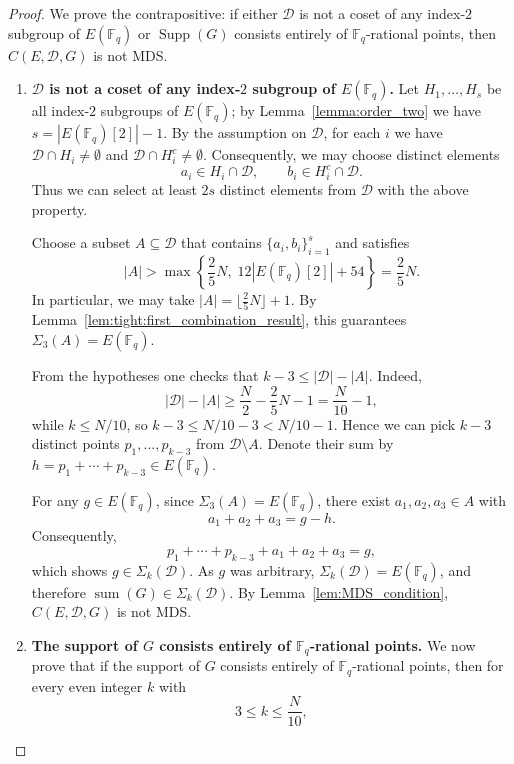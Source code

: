 \documentclass[journal,12pt,onecolumn]{IEEEtran}
\newcommand{\Point}{\operatorname{sum}}
\newcommand{\sumset}{\Sigma}
\begin{document}
\begin{proof}
We prove the contrapositive: if either $\mathcal{D}$ is not a coset of any index‑$2$ subgroup of $E(\mathbb{F}_q)$ or $\operatorname{Supp}(G)$ consists entirely of $\mathbb{F}_q$-rational points, then $C(E, \mathcal{D}, G)$ is not MDS.

\begin{enumerate}
    \item \label{item:1D}\textbf{$\mathcal{D}$ is not a coset of any index‑$2$ subgroup of $E(\mathbb{F}_q)$.} 
 Let $H_1, \dots, H_s$ be all index‑$2$ subgroups of $E(\mathbb{F}_q)$; by Lemma~\ref{lemma:order_two} we have $s = |E(\mathbb{F}_q)[2]| - 1$. By the assumption on $\mathcal{D}$, for each $i$ we have $\mathcal{D} \cap H_i \neq \emptyset$ and $\mathcal{D} \cap H_i^c \neq \emptyset$. Consequently, we may choose distinct elements
    \[
        a_i \in H_i \cap \mathcal{D}, \qquad b_i \in H_i^c \cap \mathcal{D}.
    \]
    Thus we can select at least $2s$ distinct elements from $\mathcal{D}$ with the above property.

    Choose a subset $A \subseteq \mathcal{D}$ that contains $\{a_i, b_i\}_{i=1}^s$ and satisfies
    \[
    |A| > \max\left\{ \frac{2}{5}N,\; 12|E(\mathbb{F}_q)[2]| + 54 \right\} = \frac{2}{5}N.
    \]
    In particular, we may take $|A| = \lfloor \frac{2}{5}N\rfloor + 1$. By Lemma~\ref{lem:tight:first_combination_result}, this guarantees $\sumset_3(A) = E(\mathbb{F}_q)$.

    From the hypotheses one checks that $k - 3 \le |\mathcal{D}| - |A|$. Indeed,
    \[
    |\mathcal{D}| - |A| \ge \frac{N}{2} - \frac{2}{5}N - 1 = \frac{N}{10} - 1,
    \]
    while $k \le N/10$, so $k - 3 \le N/10 - 3 < N/10 - 1$. Hence we can pick $k-3$ distinct points $p_1, \dots, p_{k-3}$ from $\mathcal{D} \setminus A$. Denote their sum by $h = p_1 + \cdots + p_{k-3} \in E(\mathbb{F}_q)$.

    For any $g \in E(\mathbb{F}_q)$, since $\sumset_3(A) = E(\mathbb{F}_q)$, there exist $a_1, a_2, a_3 \in A$ with
    \[
    a_1 + a_2 + a_3 = g - h.
    \]
    Consequently,
    \[
    p_1 + \cdots + p_{k-3} + a_1 + a_2 + a_3 = g,
    \]
    which shows $g \in \sumset_k(\mathcal{D})$. As $g$ was arbitrary, $\sumset_k(\mathcal{D}) = E(\mathbb{F}_q)$, and therefore $\Point(G) \in \sumset_k(\mathcal{D})$. By Lemma~\ref{lem:MDS_condition}, $C(E, \mathcal{D}, G)$ is not MDS.
  

    \item  \textbf{The support of $G$ consists entirely of $\mathbb{F}_q$-rational points.}
    We now prove that if the support of $G$ consists entirely of $\mathbb{F}_q$-rational points, then for every even integer $k$ with
\[
3 \le k \le \frac{N}{10},
\]



\end{enumerate}
\end{proof}
\end{document}

